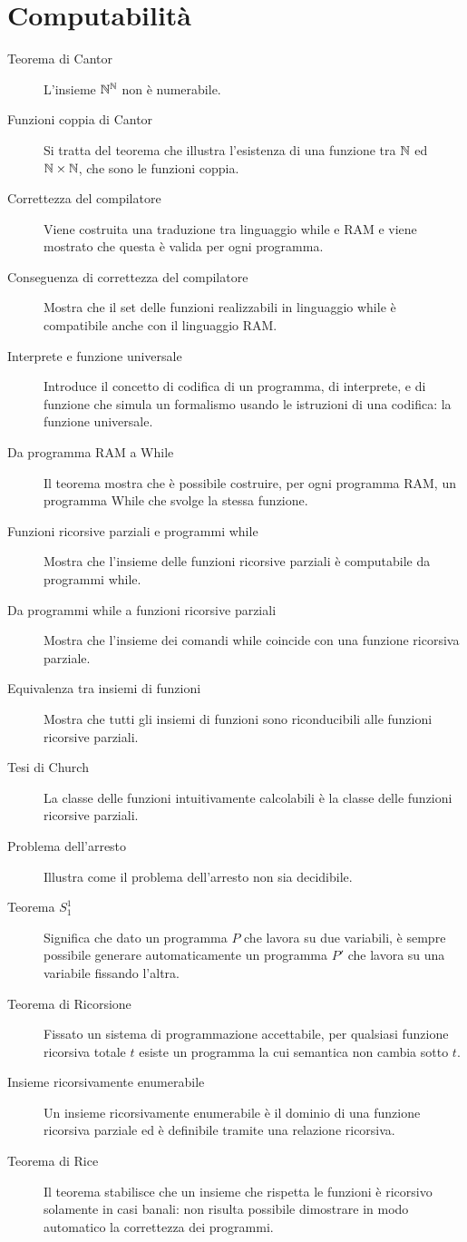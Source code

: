 \documentclass{lectures}
\begin{document}
\section{Computabilità}
\begin{multicols}{2}
\begin{description}
    \item[Teorema di Cantor] L'insieme \(\mathbb{N}^{\mathbb{N}}\) non è numerabile.
    \item[Funzioni coppia di Cantor] Si tratta del teorema che illustra l'esistenza di una funzione tra \(\mathbb{N}\) ed \(\mathbb{N}\times\mathbb{N}\), che sono le funzioni coppia.
    \item[Correttezza del compilatore] Viene costruita una traduzione tra linguaggio while e RAM e viene mostrato che questa è valida per ogni programma.
    \item[Conseguenza di correttezza del compilatore] Mostra che il set delle funzioni realizzabili in linguaggio while è compatibile anche con il linguaggio RAM.
    \item[Interprete e funzione universale] Introduce il concetto di codifica di un programma, di interprete, e di funzione che simula un formalismo usando le istruzioni di una codifica: la funzione universale.
    \item[Da programma RAM a While] Il teorema mostra che è possibile costruire, per ogni programma RAM, un programma While che svolge la stessa funzione.
    \item[Funzioni ricorsive parziali e programmi while] Mostra che l'insieme delle funzioni ricorsive parziali è computabile da programmi while.
    \item[Da programmi while a funzioni ricorsive parziali] Mostra che l'insieme dei comandi while coincide con una funzione ricorsiva parziale.
    \item[Equivalenza tra insiemi di funzioni] Mostra che tutti gli insiemi di funzioni sono riconducibili alle funzioni ricorsive parziali.
    \item[Tesi di Church] La classe delle funzioni intuitivamente calcolabili è la classe delle funzioni ricorsive parziali.
    \item[Problema dell'arresto] Illustra come il problema dell'arresto non sia decidibile.
    \item[Teorema \(S^1_1\)] Significa che dato un programma \(P\) che lavora su due variabili, è sempre possibile generare automaticamente un programma \(P'\) che lavora su una variabile fissando l'altra.
    \item[Teorema di Ricorsione] Fissato un sistema di programmazione accettabile, per qualsiasi funzione ricorsiva totale \(t\) esiste un programma la cui semantica non cambia sotto \(t\). 
    \item[Insieme ricorsivamente enumerabile] Un insieme ricorsivamente enumerabile è il dominio di una funzione ricorsiva parziale ed è definibile tramite una relazione ricorsiva.
    \item[Teorema di Rice] Il teorema stabilisce che un insieme che rispetta le funzioni è ricorsivo solamente in casi banali: non risulta possibile dimostrare in modo automatico la correttezza dei programmi.
\end{description}
\end{multicols}
\end{document}
